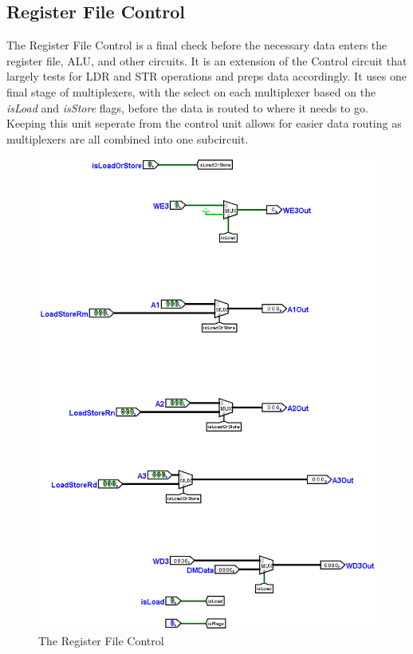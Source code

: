 \documentclass[12pt, letter]{article}
\begin{document}
	\subsection{Register File Control}
	The Register File Control is a final check before the necessary data enters the register file, ALU, and other circuits. It is an extension of the Control circuit that largely tests for LDR and STR operations and preps data accordingly. It uses one final stage of multiplexers, with the select on each multiplexer based on the \textit{isLoad} and \textit{isStore} flags, before the data is routed to where it needs to go. Keeping this unit seperate from the control unit allows for easier data routing as multiplexers are all combined into one subcircuit.
	\newpage
	\begin{figure}[h]
		\centering
		\includegraphics[scale = 0.3]{RegisterFileControl}
		\caption{The Register File Control}
		\label{fig:RegisterFileControl}
	\end{figure} 
	\newpage
	
\end{document}

